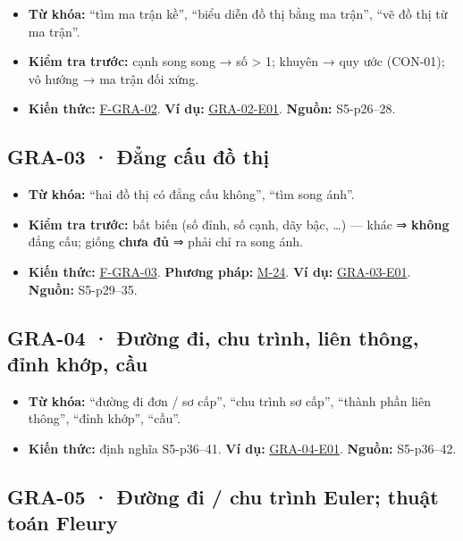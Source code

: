 \documentclass[
  10pt,
  twoside,openany]{book}
\providecommand{\tightlist}{%
  \setlength{\itemsep}{0pt}\setlength{\parskip}{0pt}}
\begin{document}
\begin{itemize}
\tightlist
\item
  \textbf{Từ khóa:} ``tìm ma trận kề'', ``biểu diễn đồ thị bằng ma
  trận'', ``vẽ đồ thị từ ma trận''.
\item
  \textbf{Kiểm tra trước:} cạnh song song → số \textgreater{} 1; khuyên
  → quy ước (CON-01); vô hướng → ma trận đối xứng.
\item
  \textbf{Kiến thức:} \protect\hyperlink{F-GRA-02}{F-GRA-02}. \textbf{Ví
  dụ:} \protect\hyperlink{GRA-02-E01}{GRA-02-E01}. \textbf{Nguồn:}
  S5-p26--28.
\end{itemize}

\hypertarget{GRA-03}{%
\subsection{GRA-03 · Đẳng cấu đồ thị}\label{GRA-03}}

\begin{itemize}
\tightlist
\item
  \textbf{Từ khóa:} ``hai đồ thị có đẳng cấu không'', ``tìm song ánh''.
\item
  \textbf{Kiểm tra trước:} bất biến (số đỉnh, số cạnh, dãy bậc, \ldots)
  --- khác ⇒ \textbf{không} đẳng cấu; giống \textbf{chưa đủ} ⇒ phải chỉ
  ra song ánh.
\item
  \textbf{Kiến thức:} \protect\hyperlink{F-GRA-03}{F-GRA-03}.
  \textbf{Phương pháp:} \protect\hyperlink{M-24}{M-24}. \textbf{Ví dụ:}
  \protect\hyperlink{GRA-03-E01}{GRA-03-E01}. \textbf{Nguồn:}
  S5-p29--35.
\end{itemize}

\hypertarget{GRA-04}{%
\subsection{GRA-04 · Đường đi, chu trình, liên thông, đỉnh khớp,
cầu}\label{GRA-04}}

\begin{itemize}
\tightlist
\item
  \textbf{Từ khóa:} ``đường đi đơn / sơ cấp'', ``chu trình sơ cấp'',
  ``thành phần liên thông'', ``đỉnh khớp'', ``cầu''.
\item
  \textbf{Kiến thức:} định nghĩa S5-p36--41. \textbf{Ví dụ:}
  \protect\hyperlink{GRA-04-E01}{GRA-04-E01}. \textbf{Nguồn:}
  S5-p36--42.
\end{itemize}

\hypertarget{GRA-05}{%
\subsection{GRA-05 · Đường đi / chu trình Euler; thuật toán
Fleury}\label{GRA-05}}
\end{document}
